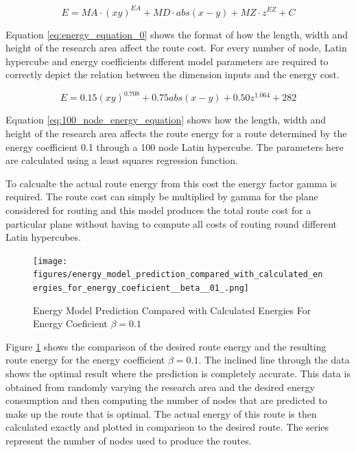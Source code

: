 \documentclass[a4paper,12pt,twoside]{article}
\begin{document}
\begin{equation}
\label{eq:energy_equation_0}
E=MA\cdot (xy)^{EA}+MD\cdot abs(x-y)+MZ\cdot z^{EZ}+C
\end{equation}

Equation \ref{eq:energy_equation_0} shows the format of how the length, width and height of the research area affect the route cost. For every number of node, Latin hypercube and energy coefficients different model parameters are required to correctly depict the relation between the dimension inputs and the energy cost.

\begin{equation}
\label{eq:100_node_energy_equation}
E=0.15(xy)^{0.708}+0.75abs(x-y)+0.50z^{1.064}+282
\end{equation}

Equation \ref{eq:100_node_energy_equation} shows how the length, width and height of the research area affects the route energy for a route determined by the energy coefficient 0.1 through a 100 node Latin hypercube. The parameters here are calculated using a least squares regression function.

To calcualte the actual route energy from this cost the energy factor gamma is required. The route cost can simply be multiplied by gamma for the plane considered for routing and this model produces the total route cost for a particular plane without having to compute all costs of routing round different Latin hypercubes.

\begin{figure}
\centering
\texttt{[image: figures/energy\_model\_prediction\_compared\_with\_calculated\_energies\_for\_energy\_coeficient\_\_beta\_\_01\_.png]} 
\caption{Energy Model Prediction Compared with Calculated Energies For Energy Coeficient $\beta = 0.1$}
\label{fig:energy_model_prediction_compared_with_calculated_energies_for_energy_coeficient_beta_01_}
\end{figure}

Figure \ref{fig:energy_model_prediction_compared_with_calculated_energies_for_energy_coeficient_beta_01_} shows the comparison of the desired route energy and the resulting route energy for the energy coefficient $\beta = 0.1$. The inclined line through the data shows the optimal result where the prediction is completely accurate. This data is obtained from randomly varying the research area and the desired energy consumption and then computing the number of nodes that are predicted to make up the route that is optimal. The actual energy of this route is then calculated exactly and plotted in comparison to the desired route. The series represent the number of nodes used to produce the routes.
\end{document}
